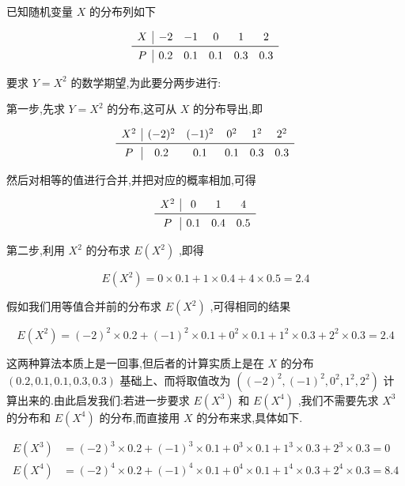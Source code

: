 \begin{example}
	已知随机变量 $ X $ 的分布列如下
	
	\[
	\begin{array}{c|ccccc}
	X &{-2} & {-1} & {0} & {1} & {2} \\ \midrule
	P & {0.2} & {0.1} & {0.1} & {0.3} & {0.3}
	\end{array}
	\]
	
	要求 $ Y=X^2 $ 的数学期望,为此要分两步进行:
	
	第一步,先求 $ Y=X^2 $ 的分布,这可从 $ X $ 的分布导出,即
	
	\[
	\begin{array}{c|ccccc}
	X^2    & (-2)^2 & (-1)^2 & 0^2    & 1^2    & 2^2 \\\midrule
	P     & 0.2   & 0.1   & 0.1   & 0.3   & 0.3 \\
	\end{array}
	\]
	
	然后对相等的值进行合并,并把对应的概率相加,可得
	
	\[
	\begin{array}{c|ccc}
	X^2    & 0     & 1     & 4 \\\midrule
	P     & 0.1   & 0.4   & 0.5 \\
	\end{array}
	\]
	
	第二步,利用 $ X^2 $ 的分布求 $ E(X^2) $ ,即得
	
	\[
	E\left(X^{2}\right)=0 \times 0.1+1 \times 0.4+4 \times 0.5=2.4
	\]
	
	假如我们用等值合并前的分布求 $ E(X^2) $ ,可得相同的结果
	
	\[
	E\left(X^{2}\right)=(-2)^{2} \times 0.2+(-1)^{2} \times 0.1+0^{2} \times 0.1+1^{2} \times 0.3+2^{2} \times 0.3=2.4
	\]
	
	这两种算法本质上是一回事,但后者的计算实质上是在 $ X $ 的分布 $ (0.2,
	0.1,0.1,0.3,0.3) $ 基础上、而将取值改为 $ \left((-2)^{2},(-1)^{2}, 0^{2}, 1^{2}, 2^{2}\right) $ 计算出来的.由此启发我们:若进一步要求 $ E(X^3) $ 和 $ E(X^4) $ ,我们不需要先求 $ X^3 $ 的分布和 $ E\left(X^{4}\right) $ 的分布,而直接用 $ X $ 的分布来求,具体如下.
	
	\[
	\begin{aligned} 
	E\left(X^{3}\right) &=(-2)^{3} \times 0.2+(-1)^{3} \times 0.1+0^{3} \times 0.1+1^{3} \times 0.3+2^{3} \times 0.3=0 \\ E\left(X^{4}\right) &=(-2)^{4} \times 0.2+(-1)^{4} \times 0.1+0^{4} \times 0.1+1^{4} \times 0.3+2^{4} \times 0.3=8.4 
	\end{aligned}
	\]
	
\end{example}




